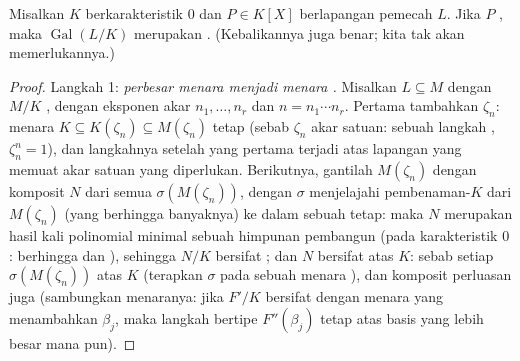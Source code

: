 \begin{theorem}[Galois]\label{thm:b3:galois:solvable}
Misalkan $K$ berkarakteristik $0$ dan $P \in K[X]$ berlapangan
pemecah $L$. Jika $P$ , maka
$\operatorname{Gal}(L/K)$ merupakan . (Kebalikannya
juga benar; kita tak akan memerlukannya.)
\end{theorem}

\begin{proof}
Langkah 1: \emph{perbesar menara  menjadi menara .} Misalkan $L
\subseteq M$ dengan $M/K$ , dengan eksponen akar $n_1, \dots,
n_r$ dan $n = n_1\cdots n_r$. Pertama tambahkan $\zeta_n$: menara
$K \subseteq K(\zeta_n) \subseteq M(\zeta_n)$ tetap 
(sebab $\zeta_n$ akar satuan: sebuah langkah , $\zeta_n^n = 1$),
dan langkahnya setelah yang pertama terjadi atas lapangan yang memuat
akar satuan yang diperlukan. Berikutnya, gantilah $M(\zeta_n)$ dengan
komposit $N$ dari semua $\sigma(M(\zeta_n))$, dengan $\sigma$ menjelajahi
pembenaman-$K$ dari $M(\zeta_n)$ (yang berhingga banyaknya) ke dalam sebuah
 tetap: maka $N$ merupakan  hasil kali
polinomial minimal sebuah himpunan pembangun (pada karakteristik $0$:
berhingga dan ), sehingga $N/K$ bersifat ; dan $N$ bersifat
 atas $K$: sebab setiap $\sigma(M(\zeta_n))$  atas $K$
(terapkan $\sigma$ pada sebuah menara ), dan komposit perluasan
 juga  (sambungkan menaranya: jika $F'/K$ bersifat
 dengan menara yang menambahkan $\beta_j$, maka langkah bertipe
$F''(\beta_j)$ tetap  atas basis yang lebih besar mana pun).


\end{proof}

